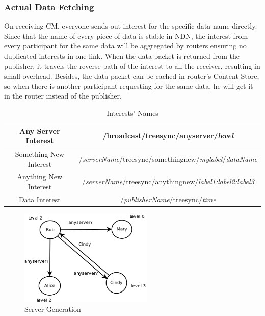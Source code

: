\documentclass[conference]{IEEEtran}
\begin{document}
\subsubsection{Actual Data Fetching}
On receiving CM, everyone sends out interest for the specific data name directly.
Since that the name of every piece of data is stable in NDN,
the interest from every participant for the same data
will be aggregated by routers ensuring no duplicated interests in one link.
When the data packet is returned from the publisher,
it travels the reverse path of the interest to all the receiver,
resulting in small overhead. Besides, the data packet can be cached in router's Content Store,
so when there is another participant requesting for the same data,
he will get it in the router instead of the publisher.

\begin{table}[!t]
\renewcommand{\arraystretch}{1.3}
\caption{Interests' Names}
\label{interest_name}
\centering
\begin{tabular}{|c|c|}
\hline
Any Server Interest & /broadcast/treesync/anyserver/\emph{level}\\
\hline
Something New Interest & /\emph{serverName}/treesync/somethingnew/\emph{mylabel}/\emph{dataName}\\
\hline
Anything New Interest & /\emph{serverName}/treesync/anythingnew/\emph{label1:label2:label3}\\
\hline
Data Interest & /\emph{publisherName}/treesync/\emph{time}\\
\hline
\end{tabular}
\end{table}

\begin{figure}[!t]
\centering
\includegraphics[width=2.5in]{../png/server-generation.png}
\caption{Server Generation}
\label{server_generation}
\end{figure}
\end{document}

